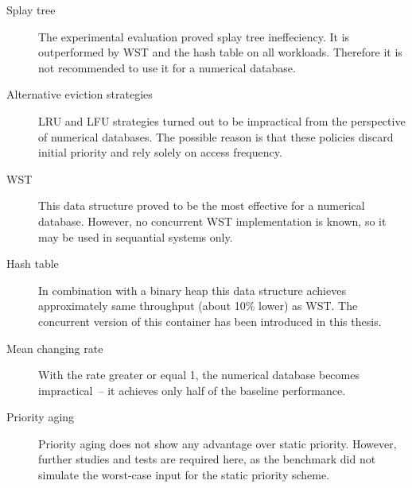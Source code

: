 \begin{center}
\end{center}

\begin{description}
\item[Splay tree]The experimental evaluation proved splay tree ineffeciency. It is outperformed by WST and the hash table on all workloads. Therefore it is not recommended to use it for a numerical database.
\item[Alternative eviction strategies] LRU and LFU strategies turned out to be impractical from the perspective of numerical databases. The possible reason is that these policies discard initial priority and rely solely on access frequency.
\item[WST] This data structure proved to be the most effective for a numerical database. However, no concurrent WST implementation is known, so it may be used in sequantial systems only.
\item[Hash table] In combination with a binary heap this data structure achieves approximately same throughput (about 10\% lower) as WST. The concurrent version of this container has been introduced in this thesis.
\item[Mean changing rate] With the rate greater or equal 1, the numerical database becomes impractical~-- it achieves only half of the baseline performance.
\item[Priority aging] Priority aging does not show any advantage over static priority. However, further studies and tests are required here, as the benchmark did not simulate the worst-case input for the static priority scheme.
\end{description}
